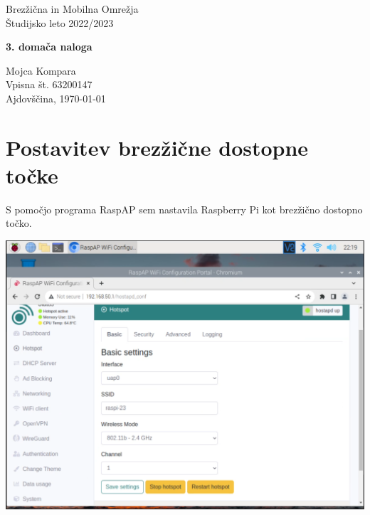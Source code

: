 \documentclass[11pt,a4paper,slovene]{article}
\begin{document}
\label{naslov}
\thispagestyle{empty}

\begin{center}
\begin{Large}
Brez\v{z}i\v{c}na in Mobilna Omre\v{z}ja\\
Študijsko leto 2022/2023\\
\end{Large}

\vspace*{4cm}
\begin{LARGE}
\textbf{3. domača naloga\\}
\end{LARGE}
\vspace*{0.5cm}

\begin{Large}

\vspace*{4cm}

Mojca Kompara\\
Vpisna št. 63200147\\

\vspace*{5cm}
Ajdovščina, \today
\end{Large}
\end{center}

\pagebreak
\setcounter{page}{1}


\label{Kazalo}
\tableofcontents
\thispagestyle{empty}
\pagebreak

\section{Postavitev brezžične dostopne točke}
S pomočjo programa RaspAP sem nastavila Raspberry Pi kot brezžično dostopno točko.

\includegraphics[width=\textwidth]{rsp}
\end{document}
